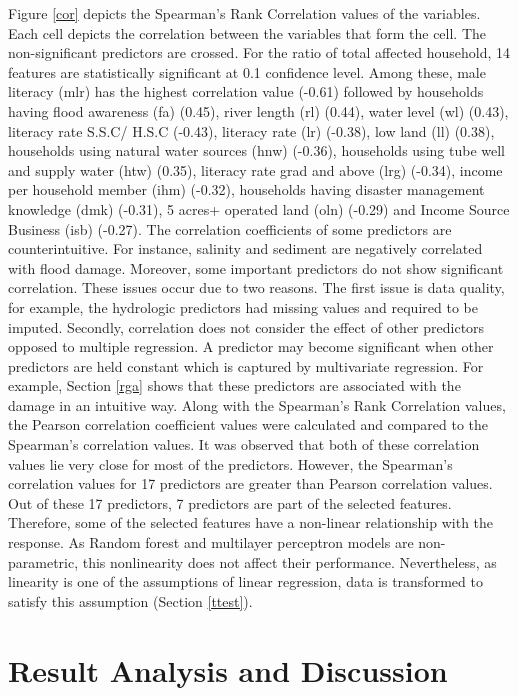 \documentclass[preprint,review,12pt]{elsarticle}
\begin{document}
Figure \ref{cor} depicts the Spearman's Rank Correlation values of the variables. Each cell depicts the correlation between the variables that form the cell. The non-significant predictors are crossed. For the ratio of total affected household, 14 features are statistically significant at 0.1 confidence level. Among these, male literacy (mlr) has the highest correlation value (-0.61) followed by households having flood awareness (fa) (0.45), river length (rl) (0.44), water level (wl) (0.43), literacy rate S.S.C/ H.S.C  (-0.43), literacy rate (lr) (-0.38), low land (ll) (0.38), households using natural water sources (hnw) (-0.36), households using tube well and supply water (htw) (0.35), literacy rate grad and above (lrg) (-0.34), income per household member (ihm) (-0.32), households having disaster management knowledge (dmk) (-0.31), 5 acres+ operated land (oln) (-0.29) and Income Source Business (isb) (-0.27). The correlation coefficients of some predictors are counterintuitive. For instance, salinity and sediment are negatively correlated with flood damage. Moreover, some important predictors do not show significant correlation. These issues occur due to two reasons. The first issue is data quality, for example, the hydrologic predictors had missing values and required to be imputed. Secondly, correlation does not consider the effect of other predictors opposed to multiple regression. A predictor may become significant when other predictors are held constant which is captured by multivariate regression. For example, Section \ref{rga} shows that these predictors are associated with the damage in an intuitive way. Along with the Spearman's Rank Correlation values, the Pearson correlation coefficient values were calculated and compared to the Spearman's correlation values. It was observed that both of these correlation values lie very close for most of the predictors. However, the Spearman's correlation values for 17 predictors are greater than Pearson correlation values. Out of these 17 predictors, 7 predictors are part of the selected features. Therefore, some of the selected features have a non-linear relationship with the response. As Random forest and multilayer perceptron models are non-parametric, this nonlinearity does not affect their performance. Nevertheless, as linearity is one of the assumptions of linear regression, data is transformed to satisfy this assumption (Section \ref{ttest}).


\section{Result Analysis and Discussion}
\end{document}
